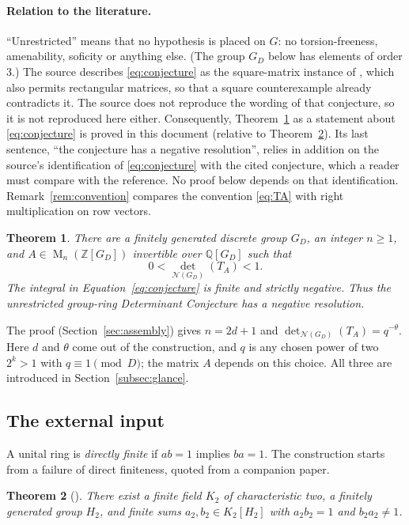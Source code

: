 \documentclass[11pt]{article}
\newtheorem{theorem}{Theorem}[section]
\theoremstyle{remark}
\numberwithin{equation}{section}
\newcommand{\Z}{\mathbb Z}
\newcommand{\Q}{\mathbb Q}
\newcommand{\Mat}{\operatorname{M}}
\newcommand{\N}{\mathcal N}
\begin{document}
\paragraph{Relation to the literature.}
``Unrestricted'' means that no hypothesis is placed on $G$: no torsion-freeness, amenability, soficity or anything else. (The group $G_D$ below has elements of order $3$.) The source describes \eqref{eq:conjecture} as the square-matrix instance of \cite[Conjecture 13.2]{Luck2002}, which also permits rectangular matrices, so that a square counterexample already contradicts it. The source does not reproduce the wording of that conjecture, so it is not reproduced here either. Consequently, Theorem~\ref{thm:main} as a statement about \eqref{eq:conjecture} is proved in this document (relative to Theorem~\ref{thm:input}). Its last sentence, ``the conjecture has a negative resolution'', relies in addition on the source's identification of \eqref{eq:conjecture} with the cited conjecture, which a reader must compare with the reference. No proof below depends on that identification. Remark~\ref{rem:convention} compares the convention \eqref{eq:TA} with right multiplication on row vectors.

\begin{theorem}\label{thm:main}
There are a finitely generated discrete group $G_D$, an integer
$n\ge1$, and $A\in\Mat_n(\Z[G_D])$ invertible over $\Q[G_D]$ such
that
\[
 0<\det_{\N(G_D)}(T_A)<1.
\]
The integral in Equation~\eqref{eq:conjecture} is finite and strictly
negative. Thus the unrestricted group-ring Determinant Conjecture
has a negative resolution.
\end{theorem}

The proof (Section~\ref{sec:assembly}) gives $n=2d+1$ and $\det_{\N(G_D)}(T_A)=q^{-\theta}$. Here $d$ and $\theta$ come out of the construction, and $q$ is any chosen power of two $2^k>1$ with $q\equiv1\pmod D$; the matrix $A$ depends on this choice. All three are introduced in Section~\ref{subsec:glance}.

\subsection{The external input}

A unital ring is \emph{directly finite} if $ab=1$ implies $ba=1$. The construction starts from a failure of direct finiteness, quoted from a companion paper.

\begin{theorem}[{\cite[Theorem 1.1]{CharacteristicTwo}}]
\label{thm:input}
There exist a finite field $K_2$ of characteristic two, a finitely
generated group $H_2$, and finite sums $a_2,b_2\in K_2[H_2]$ with
$a_2b_2=1$ and $b_2a_2\ne1$.
\end{theorem}
\end{document}
